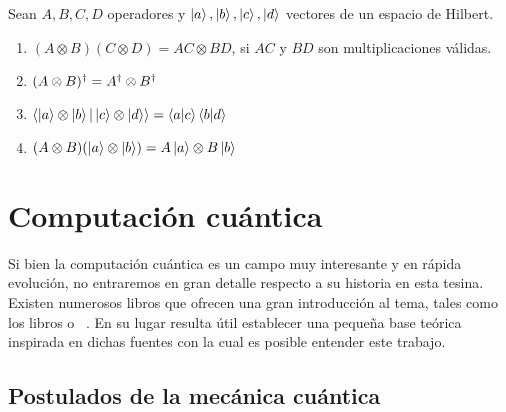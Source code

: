 \begin{propiedades} Sean $A, B, C, D$ operadores y $\ket{a}, \ket{b}, \ket{c}, \ket{d}$ vectores de un espacio de Hilbert.

  \begin{multicols}{2}
    \begin{enumerate}
    \item $(A\otimes B)(C\otimes D) = AC \otimes BD$, si $AC$ y $BD$ son multiplicaciones válidas.
    \item $(A\otimes B)^\dagger = A^\dagger\otimes B^\dagger$
    \item $\braket{\ket{a}\otimes \ket{b} | \ket{c} \otimes \ket{d}} = \braket{a|c}\braket{b|d}$ %
    \item $(A\otimes B) (\ket{a} \otimes \ket{b}) = A\ket{a} \otimes B\ket{b}$ 
    \end{enumerate}
  \end{multicols}
    
\end{propiedades}

\section{Computación cuántica}
 
Si bien la computación cuántica es un campo muy interesante y en rápida evolución, no entraremos en gran detalle respecto a su historia en esta tesina. Existen numerosos libros que ofrecen una gran introducción al tema, tales como los libros \cite{purification} o ~\cite{quantum_computer_science}. En su lugar resulta útil establecer una pequeña base teórica inspirada en dichas fuentes con la cual es posible entender este trabajo.



\subsection{Postulados de la mecánica cuántica}\label{sub:postulados}

